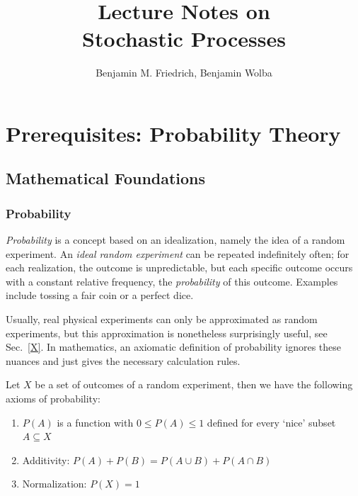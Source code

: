 \documentclass{notebook}
\title{\color{bluebase} Lecture Notes on\\ Stochastic Processes}
\author{Benjamin M. Friedrich, Benjamin Wolba}
\begin{document}
	
	
\frontmatter

\maketitle

\tableofcontents

\mainmatter

\chapter{Prerequisites: Probability Theory}

\section{Mathematical Foundations}

\subsection*{Probability}

\textit{Probability} is a concept based on an idealization, namely the idea of a random experiment.  An \textit{ideal random experiment} can be repeated indefinitely often; for each realization, the outcome is unpredictable, but each specific outcome occurs with a constant relative frequency, the \textit{probability} of this outcome. Examples include tossing a fair coin or a perfect dice.

Usually, real physical experiments can only be approximated as random experiments,  but this approximation is nonetheless surprisingly useful, see Sec.~\ref{X}. In mathematics, an axiomatic definition of probability ignores these nuances  and just gives the necessary calculation rules. 

\begin{theorem}
	Let $X$ be a set of outcomes of a random experiment, 
	then we have the following axioms of probability:
	\begin{enumerate}
		\item{$P(A)$ is a function with $0 \leq P(A) \leq 1$ defined for every `nice' subset $A \subseteq X$}
		\item{Additivity: $P(A) + P(B) = P(A \cup B) + P(A \cap B)$}
		\item{Normalization: $P(X) = 1$}
	\end{enumerate}
\end{theorem}
\end{document}
